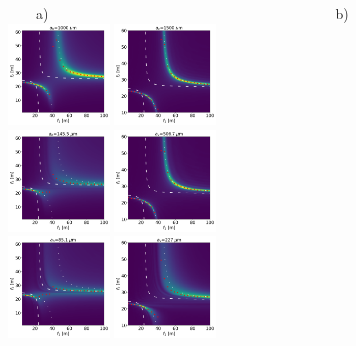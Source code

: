 \documentclass[doublecol]{epl2}
\begin{document}
\begin{figure}[htbp]
~~~~a)~~~~~~~~~~~~~~~~~~~~~~~~~~~~~~~~~~~~~~~~~b) \\
\hspace{-1.1cm}
\includegraphics[width=0.24\textwidth]{H_3.png}
\includegraphics[width=0.24\textwidth]{V_3.png}\\
\includegraphics[width=0.24\textwidth]{H_2.png}
\includegraphics[width=0.24\textwidth]{V_2.png}\\
\includegraphics[width=0.24\textwidth]{H_1.png}
\includegraphics[width=0.24\textwidth]{V_1.png}\\

\end{figure}
\end{document}
